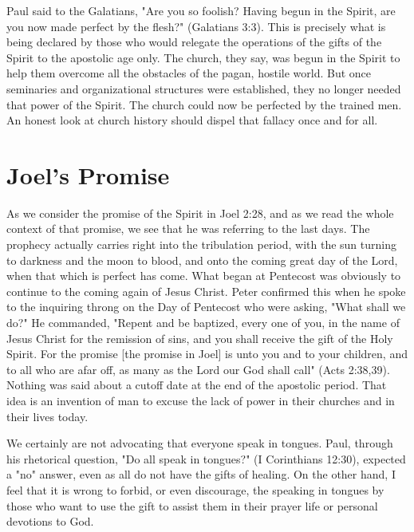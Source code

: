 Paul said to the Galatians, "Are you so foolish? Having begun in the Spirit, are you now made perfect by the flesh?" (Galatians 3:3). This is precisely what is being declared by those who would relegate the operations of the gifts of the Spirit to the apostolic age only. The church, they say, was begun in the Spirit to help them overcome all the obstacles of the pagan, hostile world. But once seminaries and organizational structures were established, they no longer needed that power of the Spirit. The church could now be perfected by the trained men. An honest look at church history should dispel that fallacy once and for all. 

\section*{Joel's Promise}

As we consider the promise of the Spirit in Joel 2:28, and as we read the whole context of that promise, we see that he was referring to the last days. The prophecy actually carries right into the tribulation period, with the sun turning to darkness and the moon to blood, and onto the coming great day of the Lord, when that which is perfect has come. What began at Pentecost was obviously to continue to the coming again of Jesus Christ. Peter confirmed this when he spoke to the inquiring throng on the Day of Pentecost who were asking, "What shall we do?" He commanded, "Repent and be baptized, every one of you, in the name of Jesus Christ for the remission of sins, and you shall receive the gift of the Holy Spirit. For the promise [the promise in Joel] is unto you and to your children, and to all who are afar off, as many as the Lord our God shall call" (Acts 2:38,39). Nothing was said about a cutoff date at the end of the apostolic period. That idea is an invention of man to excuse the lack of power in their churches and in their lives today. 

We certainly are not advocating that everyone speak in tongues. Paul, through his rhetorical question, "Do all speak in tongues?" (I Corinthians 12:30), expected a "no" answer, even as all do not have the gifts of healing. On the other hand, I feel that it is wrong to forbid, or even discourage, the speaking in tongues by those who want to use the gift to assist them in their prayer life or personal devotions to God. 


